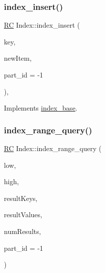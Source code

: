 \subsubsection{\texorpdfstring{index\+\_\+insert()}{index\_insert()}\hspace{0.1cm}{\footnotesize\ttfamily [2/2]}}
{\footnotesize\ttfamily \hyperlink{global_8h_a78c49a674c810fdd03d20432f7be864a}{RC} Index\+::index\+\_\+insert (\begin{DoxyParamCaption}\item[{\hyperlink{index__base_8h_ae35c40bc2f912c11f0e36ac66cba4489}{K\+E\+Y\+\_\+\+T\+Y\+PE}}]{key,  }\item[{\hyperlink{microbench_2main_8cpp_ae17cb099b4c9aee7835032339b5a9e0d}{V\+A\+L\+U\+E\+\_\+\+T\+Y\+PE}}]{new\+Item,  }\item[{int}]{part\+\_\+id = {\ttfamily -\/1} }\end{DoxyParamCaption})\hspace{0.3cm}{\ttfamily [inline]}, {\ttfamily [virtual]}}



Implements \hyperlink{classindex__base_a819b2cb7cbc7c740381e64d4c9023745}{index\+\_\+base}.

\mbox{\label{classIndex_a5e3d8773117cba2f8dc644185d560a0c}} 
\subsubsection{\texorpdfstring{index\+\_\+range\+\_\+query()}{index\_range\_query()}}
{\footnotesize\ttfamily \hyperlink{global_8h_a78c49a674c810fdd03d20432f7be864a}{RC} Index\+::index\+\_\+range\+\_\+query (\begin{DoxyParamCaption}\item[{\hyperlink{index__base_8h_ae35c40bc2f912c11f0e36ac66cba4489}{K\+E\+Y\+\_\+\+T\+Y\+PE}}]{low,  }\item[{\hyperlink{index__base_8h_ae35c40bc2f912c11f0e36ac66cba4489}{K\+E\+Y\+\_\+\+T\+Y\+PE}}]{high,  }\item[{\hyperlink{index__base_8h_ae35c40bc2f912c11f0e36ac66cba4489}{K\+E\+Y\+\_\+\+T\+Y\+PE} $\ast$}]{result\+Keys,  }\item[{\hyperlink{microbench_2main_8cpp_ae17cb099b4c9aee7835032339b5a9e0d}{V\+A\+L\+U\+E\+\_\+\+T\+Y\+PE} $\ast$}]{result\+Values,  }\item[{int $\ast$}]{num\+Results,  }\item[{int}]{part\+\_\+id = {\ttfamily -\/1} }\end{DoxyParamCaption})\hspace{0.3cm}{\ttfamily [inline]}}

